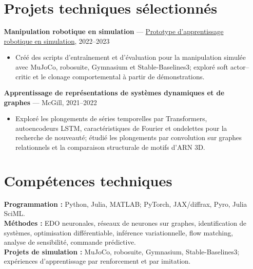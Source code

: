 \documentclass[11pt,letterpaper]{article}
\begin{document}
\section*{Projets techniques sélectionnés}
\textbf{Manipulation robotique en simulation} — \href{https://github.com/shayshay42/robot}{Prototype d'apprentissage robotique en simulation}, 2022--2023
\begin{itemize}
\item Créé des scripts d'entraînement et d'évaluation pour la manipulation simulée avec MuJoCo, robosuite, Gymnasium et Stable-Baselines3; exploré soft actor--critic et le clonage comportemental à partir de démonstrations.
\end{itemize}
\textbf{Apprentissage de représentations de systèmes dynamiques et de graphes} — McGill, 2021--2022
\begin{itemize}
\item Exploré les plongements de séries temporelles par Transformers, autoencodeurs LSTM, caractéristiques de Fourier et ondelettes pour la recherche de nouveauté; étudié les plongements par convolution sur graphes relationnels et la comparaison structurale de motifs d'ARN 3D.
\end{itemize}

\section*{Compétences techniques}
\textbf{Programmation :} Python, Julia, MATLAB; PyTorch, JAX/diffrax, Pyro, Julia SciML.\\
\textbf{Méthodes :} EDO neuronales, réseaux de neurones sur graphes, identification de systèmes, optimisation différentiable, inférence variationnelle, flow matching, analyse de sensibilité, commande prédictive.\\
\textbf{Projets de simulation :} MuJoCo, robosuite, Gymnasium, Stable-Baselines3; expériences d'apprentissage par renforcement et par imitation.
\end{document}
